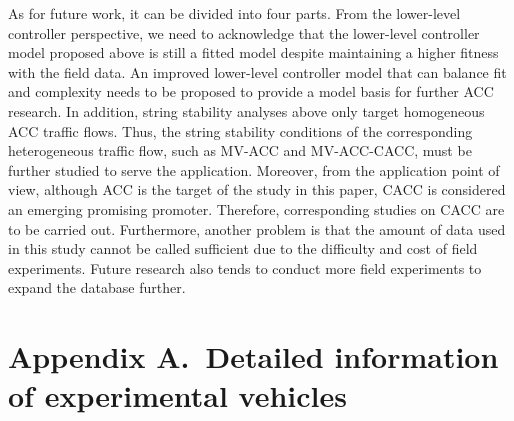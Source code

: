 \documentclass[journal]{IEEEtran}
\begin{document}
As for future work, it can be divided into four parts. From the lower-level controller perspective, we need to acknowledge that the lower-level controller model proposed above is still a fitted model despite maintaining a higher fitness with the field data. An improved lower-level controller model that can balance fit and complexity needs to be proposed to provide a model basis for further ACC research. In addition, string stability analyses above only target homogeneous ACC traffic flows. Thus, the string stability conditions of the corresponding heterogeneous traffic flow, such as MV-ACC and MV-ACC-CACC, must be further studied to serve the application. Moreover, from the application point of view, although ACC is the target of the study in this paper, CACC is considered an emerging promising promoter. Therefore, corresponding studies on CACC are to be carried out. Furthermore, another problem is that the amount of data used in this study cannot be called sufficient due to the difficulty and cost of field experiments. Future research also tends to conduct more field experiments to expand the database further.


\appendix




\section*{Appendix A.~Detailed information of experimental vehicles}
\label{AppendixA}
\end{document}
